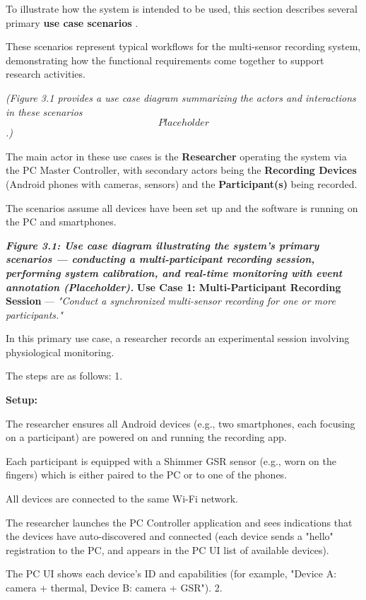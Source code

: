 To illustrate how the system is intended to be used, this section describes several
primary \textbf{use case scenarios}
.

These scenarios represent typical workflows for the multi-sensor recording system,
demonstrating how the functional requirements come together to support research
activities.

\textit{(Figure 3.1 provides a use case diagram summarizing the actors and interactions in these scenarios \[Placeholder\].)}

The main actor in these use cases is the \textbf{Researcher}
 operating the system via the PC Master Controller, with secondary actors being the
 \textbf{Recording Devices}
 (Android phones with cameras, sensors) and the \textbf{Participant(s)}
 being recorded.

The scenarios assume all devices have been set up and the software is running on the
PC and smartphones.

\textit{\textbf{Figure 3.1: Use case diagram illustrating the system's primary scenarios --- conducting a multi-participant recording session, performing system calibration, and real-time monitoring with event annotation (Placeholder).}
} \textbf{Use Case 1: Multi-Participant Recording Session}
 --- \textit{"Conduct a synchronized multi-sensor recording for one or more
 participants."}

In this primary use case, a researcher records an experimental session involving
physiological monitoring.

The steps are as follows: 1.

\textbf{Setup:}

The researcher ensures all Android devices (e.g., two smartphones, each focusing on a
participant) are powered on and running the recording app.

Each participant is equipped with a Shimmer GSR sensor (e.g., worn on the fingers)
which is either paired to the PC or to one of the phones.

All devices are connected to the same Wi-Fi network.

The researcher launches the PC Controller application and sees indications that the
devices have auto-discovered and connected (each device sends a "hello" registration
to the PC, and appears in the PC UI list of available devices).

The PC UI shows each device's ID and capabilities (for example, "Device A: camera +
thermal, Device B: camera + GSR").  2.

